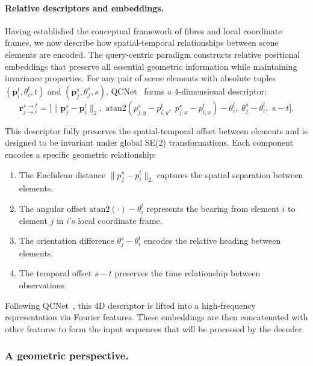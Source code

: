 \paragraph{Relative descriptors and embeddings.}
Having established the conceptual framework of fibres and local coordinate frames, we now describe how spatial-temporal relationships between scene elements are encoded. The query-centric paradigm constructs relative positional embeddings that preserve all essential geometric information while maintaining invariance properties. For any pair of scene elements with absolute tuples \((\mathbf{p}_i^t, \theta_i^t, t)\) and \((\mathbf{p}_j^s, \theta_j^s, s)\), QCNet~\cite{qcnetZhou2023} forms a 4-dimensional descriptor:
\begin{equation}
\mathbf{r}_{j\to i}^{s\to t}=
\bigl[
    \|\mathbf{p}_j^s-\mathbf{p}_i^t\|_2,\;
    \mathrm{atan2}(p_{j,y}^s-p_{i,y}^t,\;p_{j,x}^s-p_{i,x}^t)-\theta_i^t,\;
    \theta_j^s-\theta_i^t,\;
    s-t
\bigr].
\label{eq:relative_descriptor}
\end{equation}

This descriptor fully preserves the spatial-temporal offset between elements and is designed to be invariant under global SE(2) transformations. Each component encodes a specific geometric relationship:
\begin{enumerate}[label=(\roman*)]
    \item The Euclidean distance \(\|p_j^s-p_i^t\|_2\) captures the spatial separation between elements.
    \item The angular offset \(\mathrm{atan2}(\cdot)-\theta_i^t\) represents the bearing from element \(i\) to element \(j\) in \(i\)'s local coordinate frame.
    \item The orientation difference \(\theta_j^s-\theta_i^t\) encodes the relative heading between elements.
    \item The temporal offset \(s-t\) preserves the time relationship between observations.
\end{enumerate}

Following QCNet~\cite{qcnetZhou2023}, this 4D descriptor is lifted into a high-frequency representation via Fourier features. These embeddings are then concatenated with other features to form the input sequences that will be processed by the decoder.


\subsubsection*{A geometric perspective.}
\label{sssec:qc_geometric_perspective}

